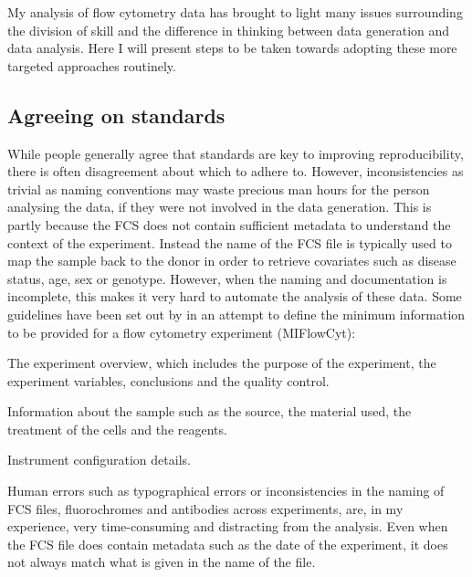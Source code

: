 My analysis of flow cytometry data has brought to light many issues surrounding the division of skill and the difference in thinking between data generation and data analysis.
Here I will present steps to be taken towards adopting these more targeted approaches routinely.

\subsection{Agreeing on standards}

While people generally agree that standards are key to improving reproducibility, there is often disagreement about which to adhere to.
However, inconsistencies as trivial as naming conventions may waste precious man hours for the person analysing the data, if they were not involved in the data generation.
This is partly because the \acrfull{FCS} does not contain sufficient metadata to understand the context of the experiment.
Instead the name of the FCS file is typically used to map the sample back to the donor in order to retrieve covariates such as disease status, age, sex or genotype.
However, when the naming and documentation is incomplete, this makes it very hard to automate the analysis of these data.
Some guidelines have been set out by \citet{Lee:2008ed} in an attempt to define the minimum information to be provided for a flow cytometry experiment (MIFlowCyt):
\begin{itemise}
\item The experiment overview, which includes the purpose of the experiment, the experiment variables, conclusions and the quality control.
\item Information about the sample such as the source, the material used, the treatment of the cells and the reagents.
\item Instrument configuration details.
\end{itemise}
Human errors such as typographical errors or inconsistencies in the naming of FCS files, fluorochromes and antibodies across experiments, are, in my experience, very time-consuming and distracting from the analysis.
Even when the FCS file does contain metadata such as the date of the experiment, it does not always match what is given in the name of the file.

